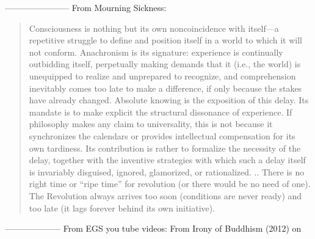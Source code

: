 \documentclass[10pt]{book}
\begin{document}
-----------------------
From Mourning Sickness:
\begin{quotation}
Consciousness is nothing but its own noncoincidence with itself—a repetitive struggle to define and position itself in a world to which it will not conform. Anachronism is its signature: experience is continually outbidding itself, perpetually making demands that it (i.e., the world) is unequipped to realize and unprepared to recognize, and comprehension inevitably comes too late to make a difference, if only because the stakes have already changed. Absolute knowing is the exposition of this delay. Its mandate is to make explicit the structural dissonance of experience. If philosophy makes any claim to universality, this is not because it synchronizes the calendars or provides intellectual compensation for its own tardiness. Its contribution is rather to formalize the necessity of the delay, together with the inventive strategies with which such a delay itself is invariably disguised, ignored, glamorized, or rationalized.
..
There is no right time or “ripe time” for revolution (or there would be no need of one). The Revolution always arrives too soon (conditions are never ready) and too late (it lags forever behind its own initiative).
\end{quotation}
--------------------
From EGS you tube videos: From Irony of Buddhism (2012) on
\end{document}
